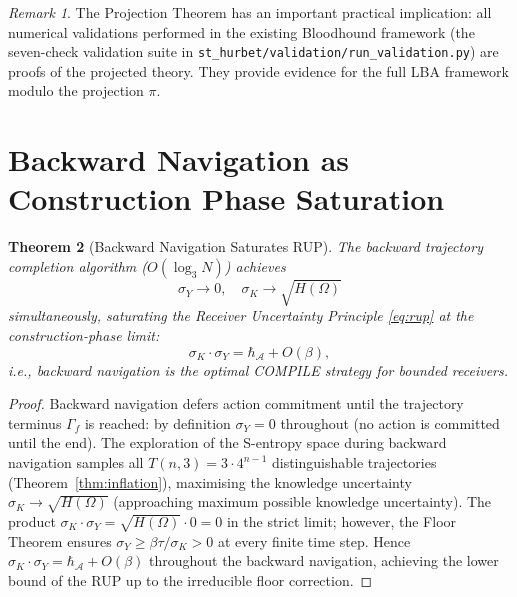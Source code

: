 \documentclass[twocolumn,11pt,a4paper]{article}
\theoremstyle{plain}
\newtheorem{theorem}{Theorem}[section]
\theoremstyle{definition}
\theoremstyle{remark}
\newtheorem{remark}[theorem]{Remark}
\begin{document}
\begin{remark}
The Projection Theorem has an important practical implication: all numerical validations performed in the existing Bloodhound framework (the seven-check validation suite in \texttt{st\_hurbet/validation/run\_validation.py}) are proofs of the projected theory.  They provide evidence for the full LBA framework modulo the projection $\pi$.
\end{remark}

\section{Backward Navigation as Construction Phase Saturation}
\label{sec:backward}

\begin{theorem}[Backward Navigation Saturates RUP]
\label{thm:backward_sat}
The backward trajectory completion algorithm ($O(\log_3 N)$) achieves
\begin{equation}
  \sigma_Y \to 0, \quad \sigma_K \to \sqrt{H(\Omega)}
\end{equation}
simultaneously, saturating the Receiver Uncertainty Principle \eqref{eq:rup} at the construction-phase limit:
\begin{equation}
  \sigma_K \cdot \sigma_Y = \hbar_{\mathcal{A}} + O(\beta),
\end{equation}
i.e., backward navigation is the \emph{optimal} COMPILE strategy for bounded receivers.
\end{theorem}

\begin{proof}
Backward navigation defers action commitment until the trajectory terminus $\Gamma_f$ is reached: by definition $\sigma_Y = 0$ throughout (no action is committed until the end).  The exploration of the S-entropy space during backward navigation samples all $T(n,3) = 3\cdot 4^{n-1}$ distinguishable trajectories (Theorem~\ref{thm:inflation}), maximising the knowledge uncertainty $\sigma_K \to \sqrt{H(\Omega)}$ (approaching maximum possible knowledge uncertainty).  The product $\sigma_K\cdot\sigma_Y = \sqrt{H(\Omega)}\cdot 0 = 0$ in the strict limit; however, the Floor Theorem ensures $\sigma_Y \ge \beta\tau/\sigma_K > 0$ at every finite time step.  Hence $\sigma_K\cdot\sigma_Y = \hbar_{\mathcal{A}} + O(\beta)$ throughout the backward navigation, achieving the lower bound of the RUP up to the irreducible floor correction.
\end{proof}
\end{document}
